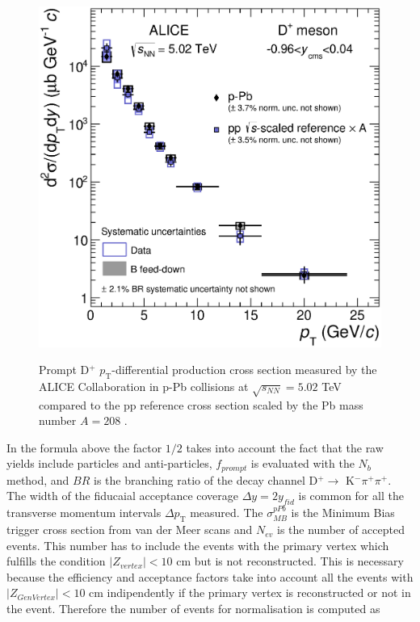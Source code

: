 \documentclass[b5paper,10pt,twoside,oldstyle,classica]{toptesi}
\newcommand{\pt}{p_\text{T}}
\begin{document}
\begin{figure}[tb]
\begin{center}
{\includegraphics[scale = 0.4]{Dplus-dsigmadpt-pPb.eps}}
\caption{Prompt D$^+$ $\pt$-differential production cross section measured by the ALICE Collaboration in p-Pb collisions at $\sqrt{s_{NN}}=5.02$ TeV compared to the pp reference cross section scaled by the Pb mass number $A=208$ \cite{Abelev:2014hha}.}
\label{paper_result}
\end{center}
\end{figure} In the formula above the factor $1/2$ takes into account the fact that the raw yields include particles and anti-particles, $f_{prompt}$ is evaluated with the $N_b$ method, and $BR$ is the branching ratio of the decay channel D$^+ \rightarrow$ K$^-\pi^+\pi^+$. The width of the fiducaial acceptance coverage $\Delta y = 2y_{fid}$ is common for all the transverse momentum intervals $\Delta \pt$ measured. The $\sigma^{pPb}_{MB}$ is the Minimum Bias trigger cross section from van der Meer scans and $N_{ev}$ is the number of accepted events. This number has to include the events with the primary vertex which fulfills the condition $|Z_{vertex}|<10$ cm but is not reconstructed. This is necessary because the efficiency and acceptance factors take into account all the events with $|Z_{GenVertex}|<10$ cm indipendently if the primary vertex is reconstructed or not in the event. Therefore the number of events for normalisation is computed as
\end{document}
